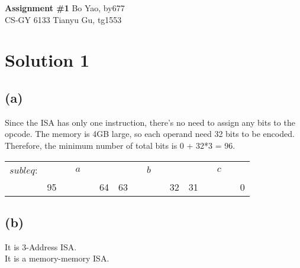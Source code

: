 \documentclass[a4paper, 11pt]{article}
\begin{document}

\noindent
\LARGE\textbf{Assignment \#1} \hfill \large Bo Yao, by677\\ 
\normalsize CS-GY 6133 \hfill Tianyu Gu, tg1553\\

\section*{Solution 1}

\subsection*{(a)}
\noindent
Since the ISA has only one instruction, there's no need to assign any bits to the opcode. The memory is 4GB large, so each operand need 32 bits to be encoded. \\[5pt]
Therefore, the minimum number of total bits is 0 + 32*3 = 96.
\noindent
\begin{center}
  \begin{tabular}{m{2cm}|*{5}{c}|*{5}{c}|*{5}{c}|}
      \cline{2-16}
      $subleq$: &&& $a$ &&&&& $b$ &&&&& $c$ &&\\
      \cline{2-16}
      \multicolumn{1}{l}{} & \multicolumn{1}{l}{95} &&&& \multicolumn{1}{r}{64} & \multicolumn{1}{l}{63} &&&& \multicolumn{1}{r}{32} & \multicolumn{1}{l}{31} &&&& \multicolumn{1}{r}{0}\\
  \end{tabular}
\end{center}

\subsection*{(b)}
It is 3-Address ISA.\\[5pt]
\indent It is a memory-memory ISA.\\

\end{document}
